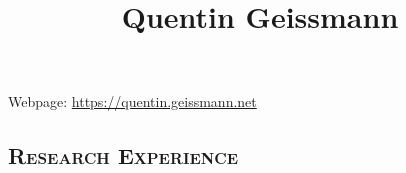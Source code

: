 \documentclass[12pt]{article}
\title{\bfseries\Huge Quentin Geissmann}
\author{\href{mailto:\sendTo}{\mymail}}
\date{}
\begin{document}
\maketitle

\begin{minipage}[ht]{0.68\textwidth}
Webpage: \href{https://quentin.geissmann.net}{https://quentin.geissmann.net}
\end{minipage}
\vspace{1pt}
\subsection*{\textsc{Research Experience}}
\end{document}
